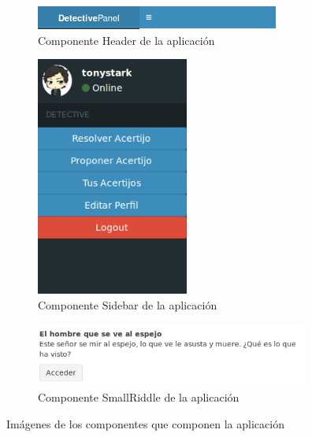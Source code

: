 \begin{figure}[hbtp] \centering
\begin{subfigure}{.6\textwidth}
     \centerline{\includegraphics[width=8cm]{figuras/header.png}}
    \caption{Componente Header de la aplicación}
    \label{fig::header}
\end{subfigure}
\par\bigskip 
\begin{subfigure}{.6\textwidth}
    \centerline{\includegraphics[width=5cm]{figuras/sidebar.png}}
    \caption{Componente Sidebar de la aplicación}
    \label{fig::sidebar}
\end{subfigure}
\par\bigskip 
\begin{subfigure}{.6\textwidth}
     \centerline{\includegraphics[width=9cm]{figuras/smallriddle.png}}
    \caption{Componente SmallRiddle de la aplicación}
    \label{fig::smallriddle}
\end{subfigure}
\caption{Imágenes de los componentes que componen la aplicación}
\end{figure}
